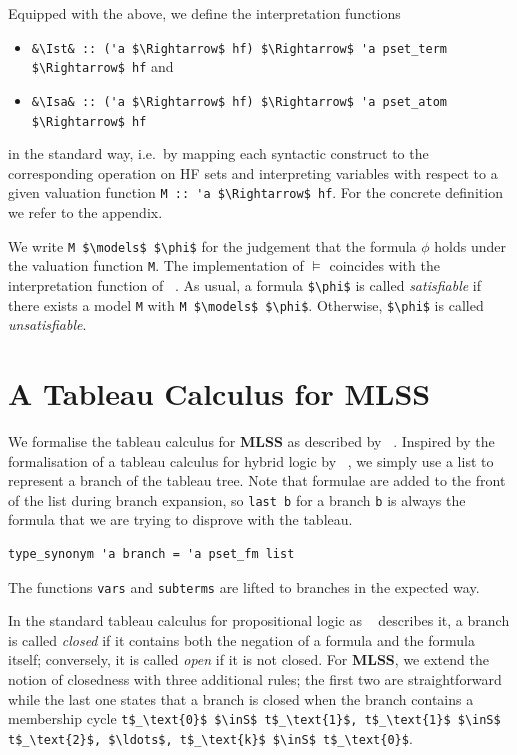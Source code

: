 \documentclass[runningheads]{llncs}
\newcommand{\MLSS}{\textbf{MLSS}}
\newcommand{\inS}{\in_\text{s}}
\newcommand{\Ist}{I$_\text{st}$}
\newcommand{\Isa}{I$_\text{sa}$}
\begin{document}
Equipped with the above, we define the interpretation functions 
\begin{itemize}
  \item \lstinline!&\Ist& :: ('a $\Rightarrow$ hf) $\Rightarrow$ 'a pset_term $\Rightarrow$ hf! and 
  \item \lstinline!&\Isa& :: ('a $\Rightarrow$ hf) $\Rightarrow$ 'a pset_atom $\Rightarrow$ hf!
\end{itemize}
in the standard way, i.e.\ by mapping each syntactic construct to the corresponding operation on HF sets and interpreting variables with respect to a given valuation function \lstinline!M :: 'a $\Rightarrow$ hf!.
For the concrete definition we refer to the appendix.

We write \lstinline!M $\models$ $\phi$! for the judgement that the formula $\phi$ holds under the valuation function \lstinline!M!.
The implementation of $\models$ coincides with the interpretation function of \citeauthor{lqe}~\cite{lqe}.
As usual, a formula \lstinline!$\phi$! is called \textit{satisfiable} if there exists a model \lstinline!M! with \lstinline!M $\models$ $\phi$!.
Otherwise, \lstinline!$\phi$! is called \textit{unsatisfiable}.

\section{A Tableau Calculus for MLSS}
We formalise the tableau calculus for \MLSS{} as described by \citeauthor{new_fast_tableau}~\cite{new_fast_tableau}.
Inspired by the formalisation of a tableau calculus for hybrid logic by \citeauthor{hybrid_logic_afp}~\cite{hybrid_logic_afp}, we simply use a list to represent a branch of the tableau tree.
Note that formulae are added to the front of the list during branch expansion, so \lstinline!last b! for a branch \lstinline!b! is always the formula that we are trying to disprove with the tableau. 
\begin{lstlisting}
type_synonym 'a branch = 'a pset_fm list
\end{lstlisting}

\noindent The functions \lstinline!vars! and \lstinline!subterms! are lifted to branches in the expected way.

In the standard tableau calculus for propositional logic as \citeauthor{tableau}~\cite{tableau} describes it, a branch is called \textit{closed} if it contains both the negation of a formula and the formula itself;
conversely, it is called \textit{open} if it is not closed.
For \MLSS{}, we extend the notion of closedness with three additional rules; the first two are straightforward while the last one states that a branch is closed when the branch contains a membership cycle
\lstinline!t$_\text{0}$ $\inS$ t$_\text{1}$, t$_\text{1}$ $\inS$ t$_\text{2}$, $\ldots$, t$_\text{k}$ $\inS$ t$_\text{0}$!.
\end{document}
